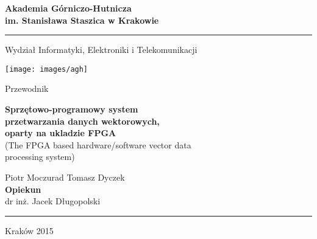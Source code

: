 \begin{titlepage}
    \begin{center}
		\fontsize{17pt}{20pt}\selectfont
        \textbf{Akademia Górniczo-Hutnicza\\im. Stanisława Staszica w Krakowie}
        \rule{\textwidth}{1.5pt}\par
        \vspace{0.5cm}
        Wydział Informatyki, Elektroniki i Telekomunikacji
        
        \vspace{1.5cm}

        \texttt{[image: images/agh]}

 		Przewodnik
 		
 		\vspace{0.5cm}
	 	\textbf{Sprzętowo-programowy system\\przetwarzania danych wektorowych,\\oparty na ukladzie FPGA}\\
		(The FPGA based hardware/software vector data\\ processing system)
		
		\vspace{0.5cm}

		Piotr Moczurad \hspace{2cm}
		Tomasz Dyczek
		\vspace{0.5cm}\\
		\textbf{Opiekun}\\
		dr inż. Jacek Długopolski
		\rule{\textwidth}{1.5pt}\par
		Kraków 2015
		
        
    \end{center}
\end{titlepage}